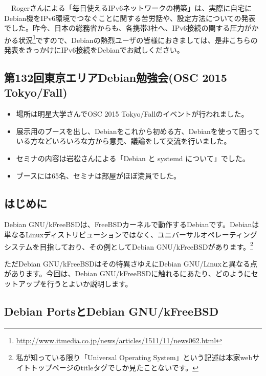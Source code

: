 \documentclass[mingoth,a4paper]{jsarticle}
\begin{document}
　Rogerさんによる「毎日使えるIPv6ネットワークの構築」は、実際に自宅にDebian機をIPv6環境でつなぐことに関する苦労話や、設定方法についての発表でした。昨今、日本の総務省からも、各携帯3社へ、IPv6接続の関する圧力がかかる状況\footnote{\url{http://www.itmedia.co.jp/news/articles/1511/11/news062.html}}ですので、Debianの熱烈ユーザの皆様におきましては、是非こちらの発表をきっかけにIPv6接続をDebianでお試しください。

\subsection{第132回東京エリアDebian勉強会(OSC 2015 Tokyo/Fall)}

\begin{itemize}
\item 場所は明星大学さんでOSC 2015 Tokyo/Fallのイベントが行われました。
\item 展示用のブースを出し、Debianをこれから初める方、Debianを使って困っている方などいろいろな方から意見、議論をして交流を行いました。
\item セミナの内容は岩松さんによる「Debian と systemd について」でした。
\item ブースには65名、セミナは部屋がほぼ満員でした。
\end{itemize} 




\subsection{はじめに}

Debian GNU/kFreeBSDは、FreeBSDカーネルで動作するDebianです。Debianは単なるLinuxディストリビューションではなく、ユニバーサルオペレーティングシステムを目指しており、その例としてDebian GNU/kFreeBSDがあります。\footnote{私が知っている限り「Universal Operating System」という記述は本家webサイトトップページのtitleタグでしか見たことないです。}

ただDebian GNU/kFreeBSDはその特異さゆえにDebian GNU/Linuxと異なる点があります。今回は、Debian GNU/kFreeBSDに触れるにあたり、どのようにセットアップを行うとよいか説明します。

\subsection{Debian PortsとDebian GNU/kFreeBSD}
\end{document}
